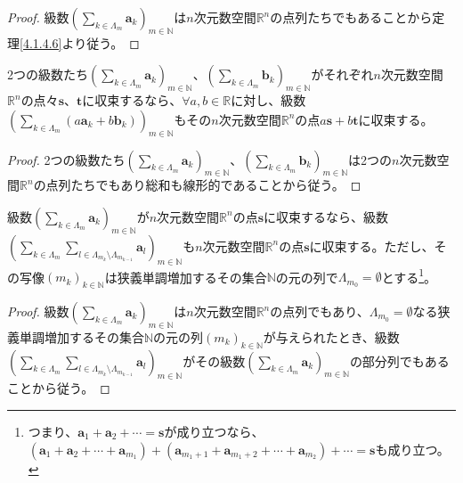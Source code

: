 \documentclass[dvipdfmx]{jsarticle}
\begin{document}
\begin{proof}
級数$\left( \sum_{k \in \varLambda_{m}} \mathbf{a}_{k} \right)_{m \in \mathbb{N}}$は$n$次元数空間$\mathbb{R}^{n}$の点列たちでもあることから定理\ref{4.1.4.6}より従う。
\end{proof}
\begin{thm}\label{4.1.8.2}
2つの級数たち$\left( \sum_{k \in \varLambda_{m}} \mathbf{a}_{k} \right)_{m \in \mathbb{N}}$、$\left( \sum_{k \in \varLambda_{m}} \mathbf{b}_{k} \right)_{m \in \mathbb{N}}$がそれぞれ$n$次元数空間$\mathbb{R}^{n}$の点々$\mathbf{s}$、$\mathbf{t}$に収束するなら、$\forall a,b \in \mathbb{R}$に対し、級数$\left( \sum_{k \in \varLambda_{m}} \left( a\mathbf{a}_{k} + b\mathbf{b}_{k} \right) \right)_{m \in \mathbb{N}}$もその$n$次元数空間$\mathbb{R}^{n}$の点$a\mathbf{s} + b\mathbf{t}$に収束する。
\end{thm}
\begin{proof}
2つの級数たち$\left( \sum_{k \in \varLambda_{m}} \mathbf{a}_{k} \right)_{m \in \mathbb{N}}$、$\left( \sum_{k \in \varLambda_{m}} \mathbf{b}_{k} \right)_{m \in \mathbb{N}}$は2つの$n$次元数空間$\mathbb{R}^{n}$の点列たちでもあり総和も線形的であることから従う。
\end{proof}
\begin{thm}\label{4.1.8.3}
級数$\left( \sum_{k \in \varLambda_{m}} \mathbf{a}_{k} \right)_{m \in \mathbb{N}}$が$n$次元数空間$\mathbb{R}^{n}$の点$\mathbf{s}$に収束するなら、級数$\left( \sum_{k \in \varLambda_{m}} {\sum_{l \in \varLambda_{m_{k}} \setminus \varLambda_{m_{k - 1}}} \mathbf{a}_{l}} \right)_{m \in \mathbb{N}}$も$n$次元数空間$\mathbb{R}^{n}$の点$\mathbf{s}$に収束する。ただし、その写像$\left( m_{k} \right)_{k \in \mathbb{N}}$は狭義単調増加するその集合$\mathbb{N}$の元の列で$\varLambda_{m_{0}} = \emptyset$とする\footnote{つまり、$\mathbf{a}_{1} + \mathbf{a}_{2} + \cdots = \mathbf{s}$が成り立つなら、$\left( \mathbf{a}_{1} + \mathbf{a}_{2} + \cdots + \mathbf{a}_{m_{1}} \right) + \left( \mathbf{a}_{m_{1} + 1} + \mathbf{a}_{m_{1} + 2} + \cdots + \mathbf{a}_{m_{2}} \right) + \cdots = \mathbf{s}$も成り立つ。}。
\end{thm}
\begin{proof}
級数$\left( \sum_{k \in \varLambda_{m}} \mathbf{a}_{k} \right)_{m \in \mathbb{N}}$は$n$次元数空間$\mathbb{R}^{n}$の点列でもあり、$\varLambda_{m_{0}} = \emptyset$なる狭義単調増加するその集合$\mathbb{N}$の元の列$\left( m_{k} \right)_{k \in \mathbb{N}}$が与えられたとき、級数$\left( \sum_{k \in \varLambda_{m}} {\sum_{l \in \varLambda_{m_{k}} \setminus \varLambda_{m_{k - 1}}} \mathbf{a}_{l}} \right)_{m \in \mathbb{N}}$がその級数$\left( \sum_{k \in \varLambda_{m}} \mathbf{a}_{k} \right)_{m \in \mathbb{N}}$の部分列でもあることから従う。
\end{proof}
\end{document}
